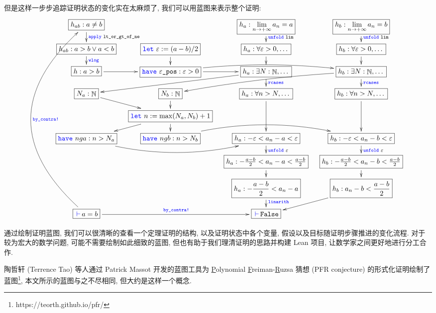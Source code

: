 \documentclass[UTF8]{ctexart}
\DeclareMathOperator{\N}{\mathbb{N}}                    %
\DeclareMathOperator{\0}{\mathbf{0}}                    %
\newcommand{\<}{\langle}
\renewcommand{\>}{\rangle}                              %
\theoremstyle{MyStyle} %
\newcommand*{\lean}[1]{\texttt{\color{blue}#1}}
\newcommand{\Goal}{\texttt{\,\color{leanblue}\ensuremath{\vdash}\,}}
\begin{document}
    但是这样一步步追踪证明状态的变化实在太麻烦了, 我们可以用蓝图来表示整个证明: 
    {\scriptsize
    \[
    \xymatrix@=10pt{
        \boxed{h_{ab}:a\neq b}\ar[d]^{\lean{apply}\,\,\texttt{lt\_or\_gt\_of\_ne}} & & \boxed{h_a:\lim_{n\to+\infty}a_n=a}\ar[d]^{\lean{unfold}\,\,\texttt{lim}} & \boxed{h_b:\lim_{n\to+\infty}a_n=b}\ar[d]^{\lean{unfold}\,\,\texttt{lim}}\\
        \boxed{h_{ab}:a>b\lor a<b}\ar[d]^{\lean{wlog}} & \boxed{\lean{let}\,\,\varepsilon:=(a-b)/2}\ar[d] & \boxed{h_a:\forall\varepsilon>0,\dots}\ar[d] & \boxed{h_b:\forall\varepsilon>0,\dots}\ar[d]\\
        \boxed{h:a>b}\ar[r] & \boxed{\lean{have}\,\,\varepsilon\texttt{\_pos}:\varepsilon>0}\ar[r]\ar@/^10pt/[rr] & \boxed{h_a:\exists N:\N,\dots}\ar[d]^{\lean{rcases}}\ar[dll] & \boxed{h_b:\exists N:\N,\dots}\ar[d]^{\lean{rcases}}\ar@/_5pt/[dll]\\
        \boxed{N_a : \N}\ar[dr] & \boxed{N_b : \N}\ar[d] & \boxed{h_a:\forall n>N, \dots}\ar[dd] & \boxed{h_b:\forall n>N, \dots}\ar[dd]\\
        & \boxed{\lean{let}\,\, n :=\max(N_a,N_b)+1}\ar[dl]\ar[d]\\
        \boxed{\lean{have}\,\, nga:n>N_a}\ar@/_20pt/[rr] & \boxed{\lean{have}\,\, ngb:n>N_b}\ar@/^20pt/[rr] & \boxed{h_a:-\varepsilon<a_n-a<\varepsilon}\ar[d]^{\lean{unfold}\,\,\varepsilon} & \boxed{h_b:-\varepsilon<a_n-b<\varepsilon}\ar[d]^{\lean{unfold}\,\,\varepsilon}\\
        & & \boxed{h_a : -\tfrac{a-b}{2}<a_n-a<\tfrac{a-b}{2}}\ar[d] & \boxed{h_b : -\tfrac{a-b}{2}<a_n-b<\tfrac{a-b}{2}}\ar[d]\\
        & & \boxed{h_a : -\frac{a-b}{2}<a_n-a}\ar[d]^{\lean{linarith}} & \boxed{h_b : a_n-b<\frac{a-b}{2}}\ar[dl]\\
        \boxed{\Goal a=b}\ar@/^80pt/[uuuuuuuu]_{\lean{by\_contra!}}\ar[rr]^{\lean{by\_contra!}} & & \boxed{\Goal\texttt{False}}
    }\]}

        通过绘制证明蓝图, 我们可以很清晰的查看一个定理证明的结构, 以及证明状态中各个变量, 假设以及目标随证明步骤推进的变化流程. 对于较为宏大的数学问题, 可能不需要绘制如此细致的蓝图, 但也有助于我们理清证明的思路并构建 Lean 项目, 让数学家之间更好地进行分工合作. 

        陶哲轩 (Terrence Tao) 等人通过 Patrick Massot 开发的蓝图工具为 \underline{P}olynomial \underline{F}reiman-\underline{R}uzsa 猜想 (PFR conjecture) 的形式化证明绘制了蓝图\footnote{https://teorth.github.io/pfr/}, 本文所示的蓝图与之不尽相同, 但大约是这样一个概念. 
\end{document}
